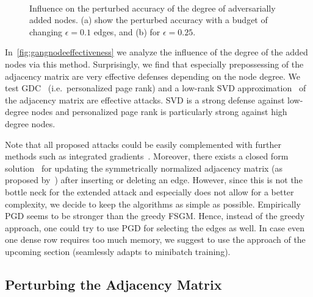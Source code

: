 \documentclass{article} %
\begin{document}
\begin{wrapfigure}[18]{r}{.65\textwidth}
  \centering
  \vspace{-15pt}
  \hbox{\hspace{15pt} \resizebox{0.9\linewidth}{!}{}}
  \vspace{-14pt}
  \caption{Influence on the perturbed accuracy of the degree of adversarially added nodes. (a) show the perturbed accuracy with a budget of changing \(\epsilon=0.1\) edges, and (b) for \(\epsilon=0.25\).\label{fig:gangnodeeffectiveness}}
\end{wrapfigure}

In~\autoref{fig:gangnodeeffectiveness} we analyze the influence of the degree of the added nodes via this method. Surprisingly, we find that especially prepossessing of the adjacency matrix are very effective defenses depending on the node degree. We test GDC~\cite{Klicpera2019a} (i.e.~personalized page rank) and a low-rank SVD approximation~\cite{Entezari2020} of the adjacency matrix are effective attacks. SVD is a strong defense against low-degree nodes and personalized page rank is particularly strong against high degree nodes.

Note that all proposed attacks could be easily complemented with further methods such as integrated gradients~\citep{Wu2019}. Moreover, there exists a closed form solution~\citep{Zugner2018, Wang2018AttackGC} for updating the symmetrically normalized adjacency matrix (as proposed by~\citet{Kipf2017}) after inserting or deleting an edge. However, since this is not the bottle neck for the extended attack and especially does not allow for a better complexity, we decide to keep the algorithms as simple as possible. Empirically PGD seems to be stronger than the greedy FSGM. Hence, instead of the greedy approach, one could try to use PGD for selecting the edges as well. In case even one dense row requires too much memory, we suggest to use the approach of the upcoming section (seamlessly adapts to minibatch training).

\subsection{Perturbing the Adjacency Matrix}\label{sec:prbcd}
\end{document}
